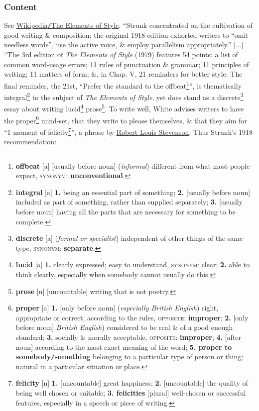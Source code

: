 \documentclass{article}
\begin{document}
\subsubsection{Content}
See \href{https://en.wikipedia.org/wiki/The_Elements_of_Style}{Wikipedia{\tt/}The Elements of Style}. ``Strunk concentrated on the cultivation of good writing \& composition; the original 1918 edition exhorted writers to ``omit needless words'', use the \href{https://en.wikipedia.org/wiki/Active_voice}{active voice}, \& employ \href{https://en.wikipedia.org/wiki/Parallelism_(grammar)}{parallelism} appropriately.'' [$\ldots$] ``The 3rd edition of {\it The Elements of Style} (1979) features 54 points: a list of common word-usage errors; 11 rules of punctuation \& grammar; 11 principles of writing; 11 matters of form; \&, in Chap. V, 21 reminders for better style. The final reminder, the 21st, ``Prefer the standard to the offbeat\footnote{{\bf offbeat} [a] [usually before noun] ({\it informal}) different from what most people expect, \textsc{synonym}: {\bf unconventional}.}'', is thematically integral\footnote{{\bf integral} [a] {\bf 1.} being an essential part of something; {\bf 2.} [usually before noun] included as part of something, rather than supplied separately; {\bf 3.} [usually before noun] having all the parts that are necessary for something to be complete.} to the subject of {\it The Elements of Style}, yet does stand as a discrete\footnote{{\bf discrete} [a] ({\it formal or specialist}) independent of other things of the same type, \textsc{synonym}: {\bf separate}.} essay about writing lucid\footnote{{\bf lucid} [a] {\bf 1.} clearly expressed; easy to understand, \textsc{synonym}: clear; {\bf 2.} able to think clearly, especially when somebody cannot usually do this.} prose\footnote{{\bf prose} [n] [uncountable] writing that is not poetry.}. To write well, White advises writers to have the proper\footnote{{\bf proper} [a] {\bf 1.} [only before noun] ({\it especially British English}) right, appropriate or correct; according to the rules, \textsc{opposite}: {\bf improper}; {\bf 2.} [only before noun] {\it British English}) considered to be real \& of a good enough standard; {\bf 3.} socially \& morally acceptable, \textsc{opposite}: {\bf improper}; {\bf 4.} [after noun] according to the most exact meaning of the word; {\bf 5. proper to somebody{\tt/}something} belonging to a particular type of person or thing; natural in a particular situation or place.} mind-set, that they write to please themselves, \& that they aim for ``1 moment of felicity\footnote{{\bf felicity} [n] {\bf 1.} [uncountable] great happiness; {\bf 2.} [uncountable] the quality of being well chosen or suitable; {\bf 3. felicities} [plural] well-chosen or successful features, especially in a speech or piece of writing.}'', a phrase by \href{https://en.wikipedia.org/wiki/Robert_Louis_Stevenson}{Robert Louis Stevenson}. Thus Strunk's 1918 recommendation:
\end{document}
